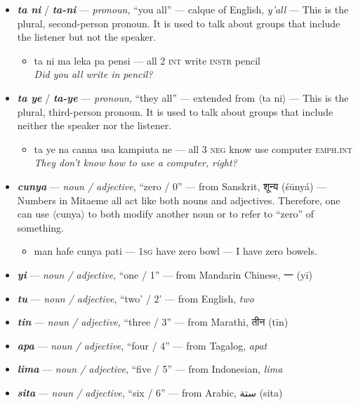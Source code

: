 \documentclass[a4paper]{article}
\begin{document}
\begin{itemize}
\begin{itemize}
	\end{itemize}
	\item \textbf{\textit{ta ni}}  / \textbf{\textit{ta-ni}} — \textit{pronoun}, ``you all'' — calque of English, \textit{y'all} — This is the plural, second-person pronoun. It is used to talk about groups that include the listener but not the speaker.
	\begin{itemize}
		\item ta ni ma leka pa pensi — all 2 \textsc{int} write \textsc{instr} pencil \\\textit{Did you all write in pencil?}
	\end{itemize}
	\item \textbf{\textit{ta ye}}  / \textbf{\textit{ta-ye}} — \textit{pronoun}, ``they all'' — extended from $\langle$ta ni$\rangle$ — This is the plural, third-person pronoun. It is used to talk about groups that include neither the speaker nor the listener.
	\begin{itemize}
		\item ta ye na canna usa kampiuta ne — all 3 \textsc{neg} know use computer \textsc{emph.int} \\\textit{They don't know how to use a computer, right?}
	\end{itemize}
	\item \textbf{\textit{cunya}} —  \textit{noun / adjective}, ``zero / 0'' — from Sanskrit, {\hmfont शून्य} (śūnyá) — Numbers in Mitaeme all act like both nouns and adjectives. Therefore, one can use $\langle$cunya$\rangle$ to both modify another noun or to refer to ``zero'' of something.
	\begin{itemize}
		\item man hafe cunya pati — \textsc{1sg} have zero bowl — I have zero bowels.
	\end{itemize}
	\item \textbf{\textit{yi}} —  \textit{noun / adjective}, ``one / 1'' — from Mandarin Chinese, 一 (yī)
	\item \textbf{\textit{tu}} —  \textit{noun / adjective}, ``two' / 2' — from English, \textit{two}
	\item \textbf{\textit{tin}} —  \textit{noun / adjective}, ``three / 3'' — from Marathi, {\hmfont तीन} (tīn)
	\item \textbf{\textit{apa}} —  \textit{noun / adjective}, ``four / 4'' — from Tagalog, \textit{apat}
	\item \textbf{\textit{lima}} —  \textit{noun / adjective}, ``five / 5'' — from Indonesian, \textit{lima}
	\item \textbf{\textit{sita}} —  \textit{noun / adjective}, ``six / 6'' — from Arabic, {\afont  ستة } (sita)

\end{itemize}
\end{document}
